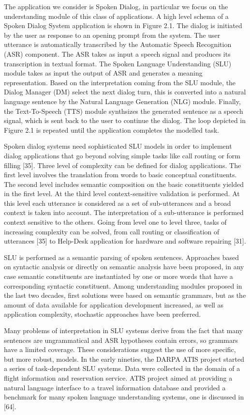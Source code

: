 The application we consider is Spoken Dialog, in particular we focus
on the understanding module of this class of applications. A high level
schema of a Spoken Dialog System application is shown in Figure 2.1. The
dialog is initiated by the user as response to an opening prompt from the
system. The user utterance is automatically transcribed by the Automatic
Speech Recognition (ASR) component. The ASR takes as input a speech
signal and produces its transcription in textual format. The Spoken Language
Understanding (SLU) module takes as input the output of ASR and
generates a meaning representation. Based on the interpretation coming
from the SLU module, the Dialog Manager (DM) select the next dialog
turn, this is converted into a natural language sentence by the Natural
Language Generation (NLG) module. Finally, the Text-To-Speech (TTS)
module synthsizes the generated sentence as a speech signal, which is sent
back to the user to continue the dialog. The loop depicted in Figure 2.1 is
repeated until the application completes the modelled task.
\par
Spoken dialog systems need sophisticated SLU models in order to implement
dialog applications that go beyond solving simple tasks like call
routing or form filling [35]. Three level of complexity can be defined for
dialog applications. The first level involves the translation from words to
basic conceptual constituents. The second level includes semantic composition on the basic constituents yielded in the first level. At the third level
context-sensitive validation is performed. At this level each utterance is
considered as a set of sub-utterances and a broad context is taken into
account. The interpretation of a sub-utterance is performed context sensitive
to the others. Going from level one to level three, tasks of increasing
complexity can be solved, from call routing or classification of utterances
[35] to Help-Desk application for hardware and software repairing [31].
\par
SLU is performed as a semantic parsing of spoken sentences. Approaches
based on syntactic analysis or directly on semantic analysis have been proposed,
in any case semantic constituents are instantiated by one or more
words that have a corresponding syntactic constituent. Among understanding
modules proposed in the last two decades, first solutions were
based on semantic grammars, but as the amount of data available for application
development increased, as well as application complexity, stochastic
approaches have been preferred.
\par
Many problems of interpretation in SLU systems derive from the fact
that many sentences are ungrammatical and ASR hypotheses contain errors,
so grammars have a limited coverage. These considerations suggest
the use of more specific, but more robust, models. In the early nineties,
the DARPA ATIS project started a series of task-dependent SLU systems.
Data were collected in the domain of a flight information and reservation
service. ATIS project aimed at providing a natural language interface to
a travel information database and provided a benchmark for many spoken
language understanding systems, one is discussed in [64].

